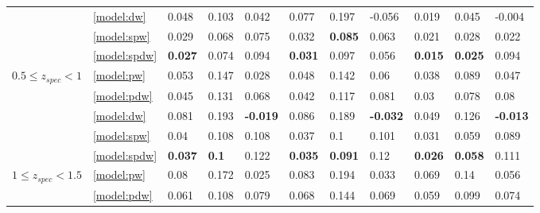\documentclass[fleqn,usenatbib]{mnras}
\begin{document}
\begin{table}
\begin{tabular}{lllllllllll}
                                   & \ref{model:dw} &                0.048 &           0.103 &            0.042 &            0.077 &           0.197 &           -0.056 &            0.019 &           0.045 &           -0.004 \\
                                   & \ref{model:spw} &                0.029 &           0.068 &            0.075 &            0.032 &  \textbf{0.085} &            0.063 &            0.021 &           0.028 &            0.022 \\
                                   & \ref{model:spdw} &       \textbf{0.027} &           0.074 &            0.094 &   \textbf{0.031} &           0.097 &            0.056 &   \textbf{0.015} &  \textbf{0.025} &            0.094 \\
\hline
            $0.5 \leq z_{spec} < 1$ & \ref{model:pw} &                0.053 &           0.147 &            0.028 &            0.048 &           0.142 &             0.06 &            0.038 &           0.089 &            0.047 \\
                                   & \ref{model:pdw} &                0.045 &           0.131 &            0.068 &            0.042 &           0.117 &            0.081 &             0.03 &           0.078 &             0.08 \\
                                   & \ref{model:dw} &                0.081 &           0.193 &  \textbf{-0.019} &            0.086 &           0.189 &  \textbf{-0.032} &            0.049 &           0.126 &  \textbf{-0.013} \\
                                   & \ref{model:spw} &                 0.04 &           0.108 &            0.108 &            0.037 &             0.1 &            0.101 &            0.031 &           0.059 &            0.089 \\
                                   & \ref{model:spdw} &       \textbf{0.037} &    \textbf{0.1} &            0.122 &   \textbf{0.035} &  \textbf{0.091} &             0.12 &   \textbf{0.026} &  \textbf{0.058} &            0.111 \\
\hline
            $1 \leq z_{spec} < 1.5$ & \ref{model:pw} &                 0.08 &           0.172 &            0.025 &            0.083 &           0.194 &            0.033 &            0.069 &            0.14 &            0.056 \\
                                   & \ref{model:pdw} &                0.061 &           0.108 &            0.079 &            0.068 &           0.144 &            0.069 &            0.059 &           0.099 &            0.074 \\

\end{tabular}
\end{table}
\end{document}
